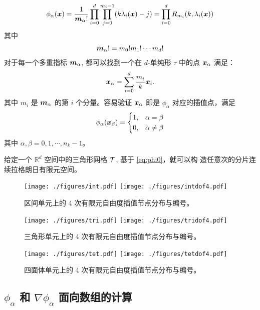 \documentclass{article}
\begin{document}
\begin{equation}
    \phi_{\alpha}({\boldsymbol x}) = \frac{1}{{\boldsymbol m}_\alpha!}\prod_{i=0}^{d}\prod_{j =
    0}^{m_i - 1} (k\lambda_i({\boldsymbol x}) - j) = \prod_{i=0}^dR_{m_i}(k, \lambda_i({\boldsymbol x}))
    \label{eq:phi0}
\end{equation}
其中
\begin{align*}
    {\boldsymbol m}_\alpha! = m_0!m_1!\cdots m_d! 
\end{align*}
对于每一个多重指标 ${\boldsymbol m}_\alpha$, 都可以找到一个在 $d$-单纯形 $\tau$ 中的点
${\boldsymbol x}_\alpha$ 满足：
\begin{equation*}
    {\boldsymbol x}_\alpha = \sum_{i=0}^d \frac{m_i}{k} {\boldsymbol x}_i. 
\end{equation*}
其中 $m_i$ 是 ${\boldsymbol m}_\alpha$ 的第 $i$ 个分量。容易验证 ${\boldsymbol x}_\alpha$ 即是
$\phi_{\alpha}$ 对应的插值点，满足 
\begin{equation}
    \phi_\alpha({\boldsymbol x}_\beta) = 
    \begin{cases}
        1, & \alpha = \beta\\
        0, & \alpha \ne \beta
    \end{cases}
    \label{eq:phi1}
\end{equation}
其中 $\alpha, \beta = 0, 1, \cdots, n_k-1$。 

给定一个 $\mathbb R^d$ 空间中的三角形网格 ${\mathcal T}$, 基于 \eqref{eq:phi0}，就可以构
造任意次的分片连续拉格朗日有限元空间。

\begin{figure}[ht]
    \centering
    \texttt{[image: ./figures/int.pdf]}
    \texttt{[image: ./figures/intdof4.pdf]}
    \caption{区间单元上的 4 次有限元自由度插值节点分布与编号。}
    \label{fig:int4}
\end{figure}

\begin{figure}[ht]
    \centering
    \texttt{[image: ./figures/tri.pdf]}
    \texttt{[image: ./figures/tridof4.pdf]}
    \caption{三角形单元上的 4 次有限元自由度插值节点分布与编号。}
    \label{fig:tri4}
\end{figure}

\begin{figure}[ht]
    \centering
    \texttt{[image: ./figures/tet.pdf]}
    \texttt{[image: ./figures/tetdof4.pdf]}
    \caption{四面体单元上的 4 次有限元自由度插值节点分布与编号。}
    \label{fig:tet4}
\end{figure}
\newpage 

\subsection{$\phi_\alpha$ 和 $\nabla \phi_\alpha$ 面向数组的计算}
\end{document}
